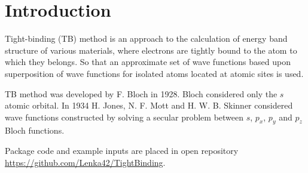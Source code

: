 \chapter{Introduction}
\label{ch:introduction}
Tight-binding (TB) method is an approach to the calculation of energy band structure of various materials, where electrons are tightly bound to the atom to which they belongs. So that an approximate set of wave functions based upon superposition of wave functions for isolated atoms located at atomic sites is used.

TB method was developed by F. Bloch \cite{bloch} in 1928.  Bloch considered only the $s$ atomic orbital. In 1934 H. Jones, N. F. Mott and H. W. B. Skinner \cite{mott} considered wave functions constructed by solving a secular problem between $s$, $p_x$, $p_y$ and $p_z$ Bloch functions.

Package code and example inputs are placed in open repository \url{https://github.com/Lenka42/TightBinding}.